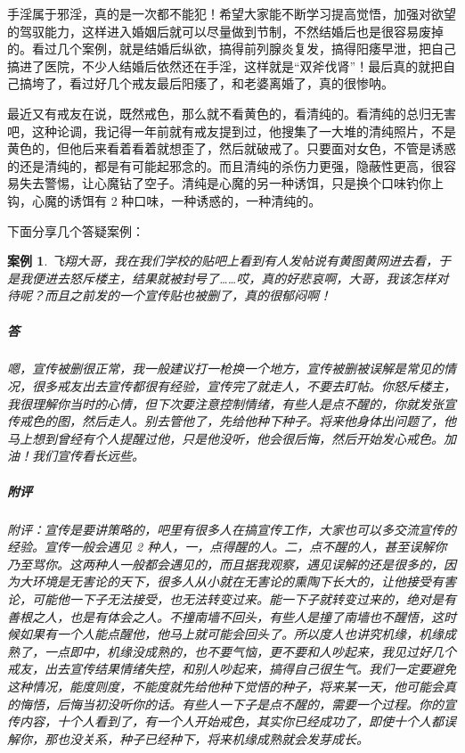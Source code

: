 \documentclass{ctexart}
\newtheorem{case}{案例}
\begin{document}
手淫属于邪淫，真的是一次都不能犯！希望大家能不断学习提高觉悟，加强对欲望的驾驭能力，这样进入婚姻后就可以尽量做到节制，不然结婚后也是很容易废掉的。看过几个案例，就是结婚后纵欲，搞得前列腺炎复发，搞得阳痿早泄，把自己搞进了医院，不少人结婚后依然还在手淫，这样就是“双斧伐肾”！最后真的就把自己搞垮了，看过好几个戒友最后阳痿了，和老婆离婚了，真的很惨呐。

最近又有戒友在说，既然戒色，那么就不看黄色的，看清纯的。看清纯的总归无害吧，这种论调，我记得一年前就有戒友提到过，他搜集了一大堆的清纯照片，不是黄色的，但他后来看着看着就想歪了，然后就破戒了。只要面对女色，不管是诱惑的还是清纯的，都是有可能起邪念的。而且清纯的杀伤力更强，隐蔽性更高，很容易失去警惕，让心魔钻了空子。清纯是心魔的另一种诱饵，只是换个口味钓你上钩，心魔的诱饵有 2 种口味，一种诱惑的，一种清纯的。

下面分享几个答疑案例：

\begin{case}
    飞翔大哥，我在我们学校的贴吧上看到有人发帖说有黄图黄网进去看，于是我便进去怒斥楼主，结果就被封号了……哎，真的好悲哀啊，大哥，我该怎样对待呢？而且之前发的一个宣传贴也被删了，真的很郁闷啊！
    \subparagraph{答} 嗯，宣传被删很正常，我一般建议打一枪换一个地方，宣传被删被误解是常见的情况，很多戒友出去宣传都很有经验，宣传完了就走人，不要去盯帖。你怒斥楼主，我很理解你当时的心情，但下次要注意控制情绪，有些人是点不醒的，你就发张宣传戒色的图，然后走人。别去管他了，先给他种下种子。将来他身体出问题了，他马上想到曾经有个人提醒过他，只是他没听，他会很后悔，然后开始发心戒色。加油！我们宣传看长远些。
    \subparagraph{附评} 附评：宣传是要讲策略的，吧里有很多人在搞宣传工作，大家也可以多交流宣传的经验。宣传一般会遇见 2 种人，一，点得醒的人。二，点不醒的人，甚至误解你乃至骂你。这两种人一般都会遇见的，而且据我观察，遇见误解的还是很多的，因为大环境是无害论的天下，很多人从小就在无害论的熏陶下长大的，让他接受有害论，可能他一下子无法接受，也无法转变过来。能一下子就转变过来的，绝对是有善根之人，也是有体会之人。不撞南墙不回头，有些人是撞了南墙也不醒悟，这时候如果有一个人能点醒他，他马上就可能会回头了。所以度人也讲究机缘，机缘成熟了，一点即中，机缘没成熟的，也不要气恼，更不要和人吵起来，我见过好几个戒友，出去宣传结果情绪失控，和别人吵起来，搞得自己很生气。我们一定要避免这种情况，能度则度，不能度就先给他种下觉悟的种子，将来某一天，他可能会真的悔悟，后悔当初没听你的话。有些人一下子是点不醒的，需要一个过程。你的宣传内容，十个人看到了，有一个人开始戒色，其实你已经成功了，即使十个人都误解你，那也没关系，种子已经种下，将来机缘成熟就会发芽成长。
\end{case}
\end{document}
